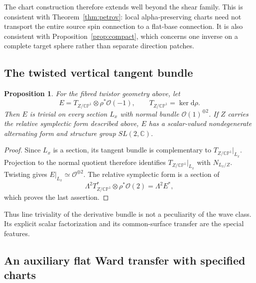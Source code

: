 \documentclass[11pt]{article}
\numberwithin{equation}{section}
\newtheorem{proposition}[theorem]{Proposition}
\theoremstyle{definition}
\theoremstyle{remark}
\newcommand{\C}{\mathbb C}
\newcommand{\CP}{\mathbb{CP}}
\newcommand{\OO}{\mathcal O}
\newcommand{\dd}{\mathrm d}
\begin{document}
The chart construction therefore extends well beyond the shear family. This is consistent with Theorem~\ref{thm:petrov}: local alpha-preserving charts need not transport the entire source spin connection to a flat-base connection. It is also consistent with Proposition~\ref{prop:compact}, which concerns one inverse on a complete target sphere rather than separate direction patches.

\subsection{The twisted vertical tangent bundle}

\begin{proposition}\label{prop:general-derivative-bundle}
For the fibred twistor geometry above, let
\begin{equation}\label{eq:general-E}
E=T_{Z/\CP^1}\otimes\rho^*\OO(-1),
\qquad T_{Z/\CP^1}=\ker\dd\rho.
\end{equation}
Then $E$ is trivial on every section $L_x$ with normal bundle $\OO(1)^{\oplus2}$. If $Z$ carries the relative symplectic form described above, $E$ has a scalar-valued nondegenerate alternating form and structure group $SL(2,\C)$.
\end{proposition}
\begin{proof}
Since $L_x$ is a section, its tangent bundle is complementary to $T_{Z/\CP^1}|_{L_x}$. Projection to the normal quotient therefore identifies $T_{Z/\CP^1}|_{L_x}$ with $N_{L_x/Z}$. Twisting gives $E|_{L_x}\simeq\OO^{\oplus2}$. The relative symplectic form is a section of
\[
\Lambda^2T_{Z/\CP^1}^*\otimes\rho^*\OO(2)=\Lambda^2E^*,
\]
which proves the last assertion.
\end{proof}

Thus line triviality of the derivative bundle is not a peculiarity of the wave class. Its explicit scalar factorization and its common-surface transfer are the special features.

\subsection{An auxiliary flat Ward transfer with specified charts}
\end{document}
